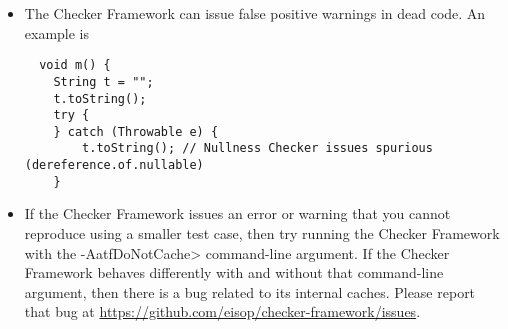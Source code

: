 \begin{itemize}
\begin{smaller}
\begin{Verbatim}
public String(char value[], @IndexFor("value") int offset, @IndexOrHigh("value") int count) { ... }
\end{Verbatim}
\end{smaller}

\noindent
you will get an error such as

\begin{smaller}
\begin{Verbatim}[]
[expression.unparsable.type.invalid] Expression in dependent type annotation invalid:
Use "#1" rather than "value"
\end{Verbatim}
\end{smaller}

Section~\ref{java-expressions-as-arguments} explains that you need to use
a different syntax to refer to a formal parameter:

\begin{smaller}
\begin{Verbatim}
public String(char value[], @IndexFor("#1") int offset, @IndexOrHigh("#1") int count) { ... }
\end{Verbatim}
\end{smaller}


\item
\label{false-positive-in-dead-code}
  The Checker Framework can issue false positive warnings in dead code.  An
  example is

\begin{smaller}
\begin{Verbatim}
  void m() {
    String t = "";
    t.toString();
    try {
    } catch (Throwable e) {
        t.toString(); // Nullness Checker issues spurious (dereference.of.nullable)
    }
\end{Verbatim}
\end{smaller}

\item
  If the Checker Framework issues an error or warning that you cannot
  reproduce using a smaller test case, then try running the Checker
  Framework with the \<-AatfDoNotCache> command-line argument.  If the
  Checker Framework behaves differently with and without that command-line
  argument, then there is a bug related to its internal caches.  Please
  report that bug at
  \url{https://github.com/eisop/checker-framework/issues}.

\end{itemize}


